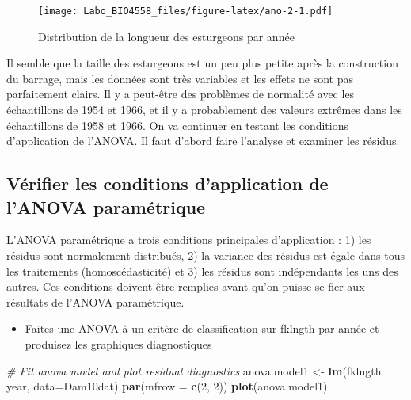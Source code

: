\documentclass[12pt,]{book}
\newenvironment{Shaded}{\begin{snugshade}}{\end{snugshade}}
\newcommand{\CommentTok}[1]{\textcolor[rgb]{0.37,0.37,0.37}{\textit{#1}}}
\newcommand{\DataTypeTok}[1]{\textcolor[rgb]{0.27,0.27,0.27}{#1}}
\newcommand{\DecValTok}[1]{\textcolor[rgb]{0.06,0.06,0.06}{#1}}
\newcommand{\KeywordTok}[1]{\textcolor[rgb]{0.27,0.27,0.27}{\textbf{#1}}}
\newcommand{\NormalTok}[1]{#1}
\newcommand{\OperatorTok}[1]{\textcolor[rgb]{0.43,0.43,0.43}{\textbf{#1}}}
\newcommand{\StringTok}[1]{\textcolor[rgb]{0.5,0.5,0.5}{#1}}
\providecommand{\tightlist}{%
  \setlength{\itemsep}{0pt}\setlength{\parskip}{0pt}}
\begin{document}
\begin{figure}
\centering
\texttt{[image: Labo\_BIO4558\_files/figure-latex/ano-2-1.pdf]}
\caption{\label{fig:ano-2}Distribution de la longueur des esturgeons par année}
\end{figure}

Il semble que la taille des esturgeons est un peu plus petite après la construction du barrage, mais les données sont très variables et les effets ne sont pas parfaitement clairs. Il y a peut-être des problèmes de normalité avec les échantillons de 1954 et 1966, et il y a probablement des valeurs extrêmes dans les échantillons de 1958 et 1966. On va continuer en testant les conditions d'application de l'ANOVA. Il faut d'abord faire l'analyse et examiner les résidus.

\hypertarget{vuxe9rifier-les-conditions-dapplication-de-lanova-paramuxe9trique}{%
\subsection{Vérifier les conditions d'application de l'ANOVA paramétrique}\label{vuxe9rifier-les-conditions-dapplication-de-lanova-paramuxe9trique}}

L'ANOVA paramétrique a trois conditions principales d'application : 1) les résidus sont normalement distribués, 2) la variance des résidus est égale dans tous les traitements (homoscédasticité) et 3) les résidus sont indépendants les uns des autres. Ces conditions doivent être remplies avant qu'on puisse se fier aux résultats de l'ANOVA paramétrique.

\begin{itemize}
\tightlist
\item
  Faites une ANOVA à un critère de classification sur fklngth par année et produisez les graphiques diagnostiques
\end{itemize}

\begin{Shaded}
\begin{Highlighting}[]
\CommentTok{# Fit anova model and plot residual diagnostics}
\NormalTok{anova.model1 <-}\StringTok{ }\KeywordTok{lm}\NormalTok{(fklngth }\OperatorTok{~}\StringTok{ }\NormalTok{year, }\DataTypeTok{data=}\NormalTok{Dam10dat)}
\KeywordTok{par}\NormalTok{(}\DataTypeTok{mfrow =} \KeywordTok{c}\NormalTok{(}\DecValTok{2}\NormalTok{, }\DecValTok{2}\NormalTok{))}
\KeywordTok{plot}\NormalTok{(anova.model1)}
\end{Highlighting}
\end{Shaded}
\end{document}
